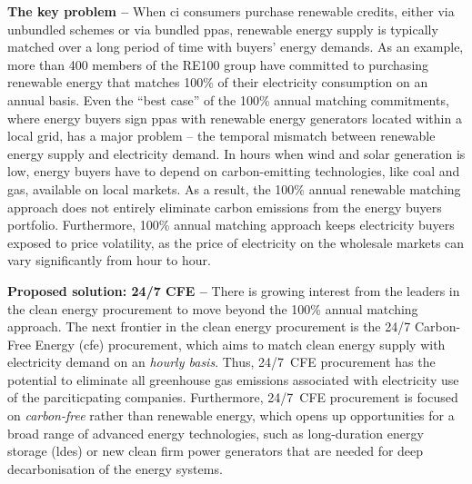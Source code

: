 \textbf{The key problem --} When \gls{ci} consumers purchase renewable credits, either via unbundled schemes or via bundled \gls{ppa}s, renewable energy supply is typically matched over a long period of time with buyers' energy demands.
As an example, more than 400 members of the RE100 group \cite{re100report-2020} have committed to purchasing renewable energy that matches 100\% of their electricity consumption on an annual basis.
Even the \enquote{best case} of the 100\% annual matching commitments, where energy buyers sign \gls{ppa}s with renewable energy generators located within a local grid, has a major problem -- the temporal mismatch between renewable energy supply and electricity demand.
In hours when wind and solar generation is low, energy buyers have to depend on carbon-emitting technologies, like coal and gas, available on local markets.
As a result, the 100\% annual renewable matching approach does not entirely eliminate carbon emissions from the energy buyers portfolio.
Furthermore, 100\% annual matching approach keeps electricity buyers exposed to price volatility, as the price of electricity on the wholesale markets can vary significantly from hour to hour.


\textbf{Proposed solution: 24/7 CFE --} There is growing interest from the leaders in the clean energy procurement to move beyond the 100\% annual matching approach.
The next frontier in the clean energy procurement is the 24/7 Carbon-Free Energy (\gls{cfe}) procurement, which aims to match clean energy supply with electricity demand on an \textit{hourly basis}.
Thus, 24/7~CFE procurement has the potential to eliminate all greenhouse gas emissions associated with electricity use of the parciticpating companies.
Furthermore, 24/7~CFE procurement is focused on \textit{carbon-free} rather than renewable energy, which opens up opportunities for a broad range of advanced energy technologies, such as long-duration energy storage (\gls{ldes}) or new clean firm power generators that are needed for deep decarbonisation of the energy systems.

